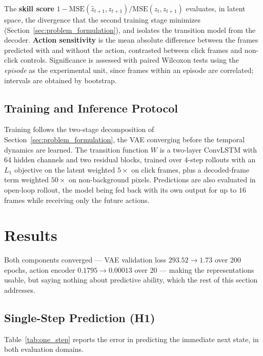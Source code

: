 \documentclass[conference]{IEEEtran}
\begin{document}
The \textbf{skill score} $1 - \mathrm{MSE}(\hat{z}_{t+1}, z_{t+1})/\mathrm{MSE}(z_t, z_{t+1})$ evaluates, in latent space, the divergence that the second training stage minimizes (Section~\ref{sec:problem_formulation}), and isolates the transition model from the decoder. \textbf{Action sensitivity} is the mean absolute difference between the frames predicted with and without the action, contrasted between click frames and non-click controls. Significance is assessed with paired Wilcoxon tests using the \emph{episode} as the experimental unit, since frames within an episode are correlated; intervals are obtained by bootstrap.

\subsection{Training and Inference Protocol}

Training follows the two-stage decomposition of Section~\ref{sec:problem_formulation}, the VAE converging before the temporal dynamics are learned. The transition function $W$ is a two-layer ConvLSTM with 64 hidden channels and two residual blocks, trained over $4$-step rollouts with an $L_1$ objective on the latent weighted $5\times$ on click frames, plus a decoded-frame term weighted $50\times$ on non-background pixels. Predictions are also evaluated in open-loop rollout, the model being fed back with its own output for up to $16$ frames while receiving only the future actions.


\section{Results}
\label{sec:results}

Both components converged --- VAE validation loss $293.52 \rightarrow 1.73$ over 200 epochs, action encoder $0.1795 \rightarrow 0.00013$ over 20 --- making the representations usable, but saying nothing about predictive ability, which the rest of this section addresses.

\subsection{Single-Step Prediction (H1)}

Table~\ref{tab:one_step} reports the error in predicting the immediate next state, in both evaluation domains.
\end{document}
